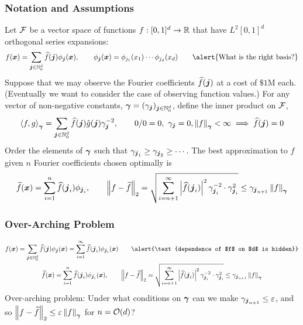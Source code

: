 \documentclass[11pt,compress,xcolor={usenames,dvipsnames},aspectratio=169]{beamer}
\begin{document}
\begin{frame}
\frametitle{Notation and Assumptions}
\vspace{-4ex}
Let $\cf$ be a vector space of functions $f:[0,1]^d \to \reals$ that have  $L^2[0,1]^d$ orthogonal series expansions:
\[
f(\vx) = \sum_{\vj \in \natzero^d} \hf(\vj) \phi_{\vj}(\vx), \qquad \phi_{\vj}(\vx) = \phi_{j_1}(x_1) \cdots  \phi_{j_d}(x_d) \qquad \alert{\text{What is the right basis?}}
\]
Suppose that we may observe the Fourier coefficients $\hf(\vj)$ at a cost of $\$1$M each. (\alert{Eventually we want to consider the case of observing function values.})  For any vector of non-negative constants, $\vgamma = (\gamma_{\vj})_{\vj \in \natzero^d}$, define the inner product on $\cf$, 
\[
\ip[\vgamma]{f}{g} = \sum_{\vj \in \natzero^d} \hf(\vj)\hg(\vj) \gamma_{\vj}^{-2}, \qquad 0/0 = 0,\ \gamma_{\vj} = 0, \norm[\vgamma]{f} < \infty \implies \hf(\vj) = 0
\]
Order the elements of $\vgamma$ such that $\gamma_{\vj_1} \ge \gamma_{\vj_2} \ge \cdots$.  The best approximation to $f$ given $n$ Fourier coefficients chosen optimally is 
\begin{equation*}
\tf(\vx) = \sum_{i=1}^{n} \hf(\vj_i) \phi_{\vj_i}, \qquad \norm[2]{f - \tf} = 
\sqrt{\sum_{i = n+1}^{\infty} \abs{\hf(\vj_i)}^2 \gamma_{\vj_{i}}^{-2}  \cdot \gamma_{\vj_{i}}^2} \le \gamma_{\vj_{n+1}} \norm[\vgamma]{f}
\end{equation*}
\end{frame}

\begin{frame}
\frametitle{Over-Arching Problem}
\vspace{-6ex}
\begin{gather*}
f(\vx) = \sum_{\vj \in \natzero^d} \hf(\vj) \phi_{\vj}(\vx) =  \sum_{i =1}^{\infty} \hf(\vj_i) \phi_{\vj_i}(\vx) \qquad \alert{\text{dependence of $f$ on $d$ is hidden}}  
\\
\tf(\vx) = \sum_{i=1}^{n} \hf(\vj_i) \phi_{\vj_i}(\vx), \qquad \norm[2]{f - \tf} = 
\sqrt{\sum_{i = n+1}^{\infty} \abs{\hf(\vj_i)}^2 \gamma_{\vj_{i}}^{-2}  \cdot \gamma_{\vj_{i}}^2} \le \gamma_{\vj_{n+1}} \norm[\vgamma]{f}
\end{gather*}
\alert{Over-arching problem: } Under what conditions on $\vgamma$ can we make $\gamma_{\vj_{n+1}} \le \varepsilon$, and so $\norm[2]{f - \tf}  \le \varepsilon \norm[\vgamma]{f}$ for \alert{$n = \Order(d)$}?

\end{frame}
\end{document}
